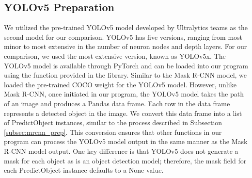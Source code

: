 \subsection{YOLOv5 Preparation}

We utilized the pre-trained YOLOv5 model developed by Ultralytics teams as the second model for our comparison. YOLOv5 has five versions, ranging from most minor to most extensive in the number of neuron nodes and depth layers. For our comparison, we used the most extensive version, known as YOLOv5x. The YOLOv5 model is available through PyTorch and can be loaded into our program using the  function provided in the  library. Similar to the Mask R-CNN model, we loaded the pre-trained COCO weight for the YOLOv5 model. However, unlike Mask R-CNN, once initiated in our program, the YOLOv5 model takes the path of an image and produces a Pandas data frame. Each row in the data frame represents a detected object in the image. We convert this data frame into a list of PredictObject instances, similar to the process described in Subsection \ref{subsec:mrcnn_prep}. This conversion ensures that other functions in our program can process the YOLOv5 model output in the same manner as the Mask R-CNN model output. One key difference is that YOLOv5 does not generate a mask for each object as is an object detection model; therefore, the mask field for each PredictObject instance defaults to a None value.